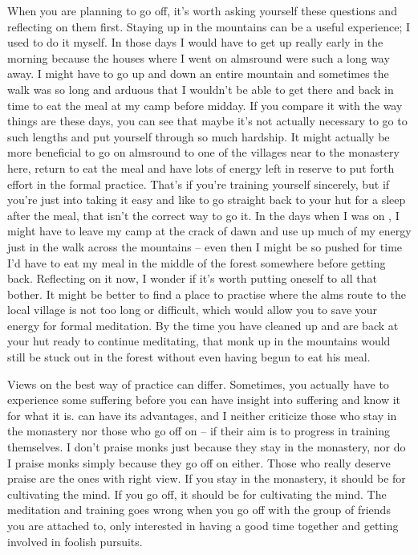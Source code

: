 When you are planning to go off, it's worth asking yourself these questions and reflecting on them first. Staying up in the mountains can be a useful experience; I used to do it myself. In those days I would have to get up really early in the morning because the houses where I went on almsround were such a long way away. I might have to go up and down an entire mountain and sometimes the walk was so long and arduous that I wouldn't be able to get there and back in time to eat the meal at my camp before midday. If you compare it with the way things are these days, you can see that maybe it's not actually necessary to go to such lengths and put yourself through so much hardship. It might actually be more beneficial to go on almsround to one of the villages near to the monastery here, return to eat the meal and have lots of energy left in reserve to put forth effort in the formal practice. That's if you're training yourself sincerely, but if you're just into taking it easy and like to go straight back to your hut for a sleep after the meal, that isn't the correct way to go it. In the days when I was on , I might have to leave my camp at the crack of dawn and use up much of my energy just in the walk across the mountains -- even then I might be so pushed for time I'd have to eat my meal in the middle of the forest somewhere before getting back. Reflecting on it now, I wonder if it's worth putting oneself to all that bother. It might be better to find a place to practise where the alms route to the local village is not too long or difficult, which would allow you to save your energy for formal meditation. By the time you have cleaned up and are back at your hut ready to continue meditating, that monk up in the mountains would still be stuck out in the forest without even having begun to eat his meal.

Views on the best way of practice can differ. Sometimes, you actually have to experience some suffering before you can have insight into suffering and know it for what it is.  can have its advantages, and I neither criticize those who stay in the monastery nor those who go off on  -- if their aim is to progress in training themselves. I don't praise monks just because they stay in the monastery, nor do I praise monks simply because they go off on  either. Those who really deserve praise are the ones with right view. If you stay in the monastery, it should be for cultivating the mind. If you go off, it should be for cultivating the mind. The meditation and training goes wrong when you go off with the group of friends you are attached to, only interested in having a good time together and getting involved in foolish pursuits.
\vspace*{\baselineskip}

